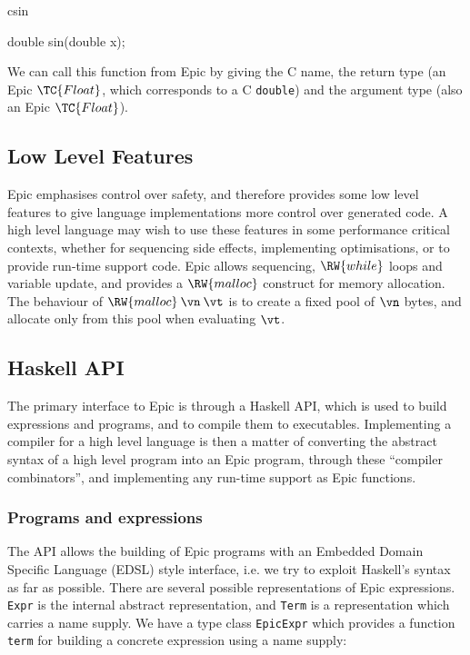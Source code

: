 \begin{SaveVerbatim}{csin}

double sin(double x);

\end{SaveVerbatim}

\noindent
We can call this function from Epic by giving the C name, the return
type (an Epic $\TC{Float}$, which corresponds to a C \texttt{double})
and the argument type (also an Epic $\TC{Float}$).


\subsection{Low Level Features}

Epic emphasises control over safety, and therefore provides some low
level features to give language implementations more control over
generated code.  A high level language may wish to use these features
in some performance critical contexts, whether for sequencing side
effects, implementing optimisations, or to provide run-time support
code. 
Epic allows sequencing, $\RW{while}$ loops and variable update, and
provides a $\RW{malloc}$ construct for memory allocation. The
behaviour of $\RW{malloc}\:\vn\:\vt$ is to create a fixed pool of
$\vn$ bytes, and allocate only from this pool when evaluating
$\vt$. 

\subsection{Haskell API}

The primary interface to Epic is through a Haskell API, which is used
to build expressions and programs, and to compile them to executables.
Implementing a compiler for a high level language is then a matter of
converting the abstract syntax of a high level program into an Epic
program, through these ``compiler combinators'', and implementing any
run-time support as Epic functions.

\subsubsection*{Programs and expressions}

The API allows the building of Epic programs with an Embedded Domain
Specific Language (EDSL) style interface, i.e. we try to exploit
Haskell's syntax as far as possible. There are several
possible representations of Epic expressions.
\texttt{Expr} is the internal abstract representation, and
\texttt{Term} is a representation which carries a name supply. We have
a type class \texttt{EpicExpr} which provides a function \texttt{term}
for building a concrete expression using a name supply:

